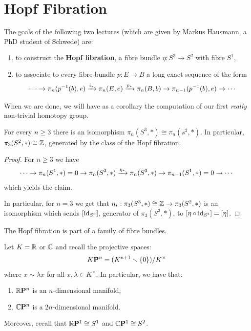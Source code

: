 
\section{Hopf Fibration}


The goals of the following two lectures (which are given by Markus Hausmann, a PhD student of Schwede) are:
\begin{enumerate}
    \item to construct the \textbf{Hopf fibration}, a fibre bundle $\eta:S^3\to S^2$ with fibre $S^1$,
    \item to associate to every fibre bundle $p:E\to B$ a long exact sequence of the form
    \[\cdots\to\pi_n(p^{-1}(b),e)\xrightarrow{i_*}\pi_n(E,e)\xrightarrow{p_*}\pi_n(B,b)\to\pi_{n-1}(p^{-1}(b),e)\to\cdots\]
\end{enumerate}

When we are done, we will have as a corollary the computation of our first \textit{really} non-trivial homotopy group.

\begin{corollary}
For every $n\geq 3$ there is an isomorphism $\pi_n(S^3,*)\cong\pi_n(s^2,*)$. In particular, $\pi_3(S^2,*)\cong{\mathbb Z}$, generated by the class of the Hopf fibration.
\end{corollary}

\begin{proof}
For $n\geq3$ we have
\[\cdots\to\pi_n(S^1,*)=0\to\pi_n(S^3,*)\xrightarrow{\eta_*}\pi_n(S^3,*)\to\pi_{n-1}(S^1,*)=0\to\cdots\]
which yields the claim.

In particular, for $n=3$ we get that $\eta_*:\pi_3(S^3,*)\cong{\mathbb Z}\to\pi_3(S^2,*)$ is an isomorphism which sends $[\operatorname{id}_{S^3}]$, generator of $\pi_3(S^3,*)$, to $[\eta\circ\operatorname{id}_{S^3}]=[\eta]$.
\end{proof}

The Hopf fibration is part of a family of fibre bundles.

Let $K={\mathbb R}$ or $\mathbb{C}$ and recall the projective spaces:
\[{K\mathbf{P}^n}=(K^{n+1}\smallsetminus\{0\})/K^\times\]
where $x\sim\lambda x$ for all $x,\lambda\in K^\times$. In particular, we have that:
\begin{enumerate}[label={-}]
    \item ${{\mathbb R}\mathbf{P}^n}$ is an $n$-dimensional manifold,
    \item ${\mathbb{C}\mathbf{P}^n}$ is a $2n$-dimensional manifold.
\end{enumerate}
Moreover, recall that ${{\mathbb R}\mathbf{P}^{1}}\cong S^1$ and ${\mathbb{C}\mathbf{P}^{1}}\cong S^2$.

